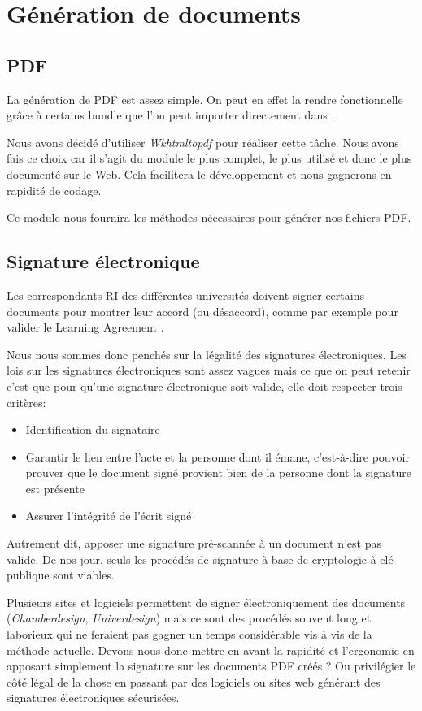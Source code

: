 \section{Génération de documents}
\subsection{PDF}

La génération de PDF est assez simple. On peut en effet la rendre fonctionnelle grâce à certains bundle que l'on peut importer directement dans \symfony.

Nous avons décidé d'utiliser \textit{Wkhtmltopdf} pour réaliser cette tâche.
Nous avons fais ce choix car il s'agit du module le plus complet, le plus utilisé et donc le plus documenté sur le Web. Cela facilitera le développement et nous gagnerons en rapidité de codage.

Ce module nous fournira les méthodes nécessaires pour générer nos fichiers PDF.


\subsection{Signature électronique}
Les correspondants RI des différentes universités doivent signer certains documents pour montrer leur accord (ou désaccord), comme par exemple pour valider le \og Learning Agreement \fg.

Nous nous sommes donc penchés sur la légalité des signatures électroniques.
Les lois sur les signatures électroniques sont assez vagues mais ce que on peut retenir c'est que pour qu'une signature électronique soit valide, elle doit respecter trois critères:
\begin{itemize}
\item Identification du signataire
\item Garantir le lien entre l'acte et la personne dont il émane, c'est-à-dire pouvoir prouver que le document signé provient bien de la personne dont la signature est présente
\item Assurer l'intégrité de l'écrit signé
\end{itemize}

\smallbreak

Autrement dit, apposer une signature pré-scannée à un document n'est pas valide.
De nos jour, seuls les procédés de signature à base de cryptologie à clé publique sont viables.

Plusieurs sites et logiciels permettent de signer électroniquement des documents (\textit{Chamberdesign}, \textit{Univerdesign}) mais ce sont des procédés souvent long et laborieux qui ne feraient pas gagner un temps considérable vis à vis de la méthode actuelle.
Devons-nous donc mettre en avant la rapidité et l'ergonomie en apposant simplement la signature sur les documents PDF créés ? Ou privilégier le côté légal de la chose en passant par des logiciels ou sites web générant des signatures électroniques sécurisées.

